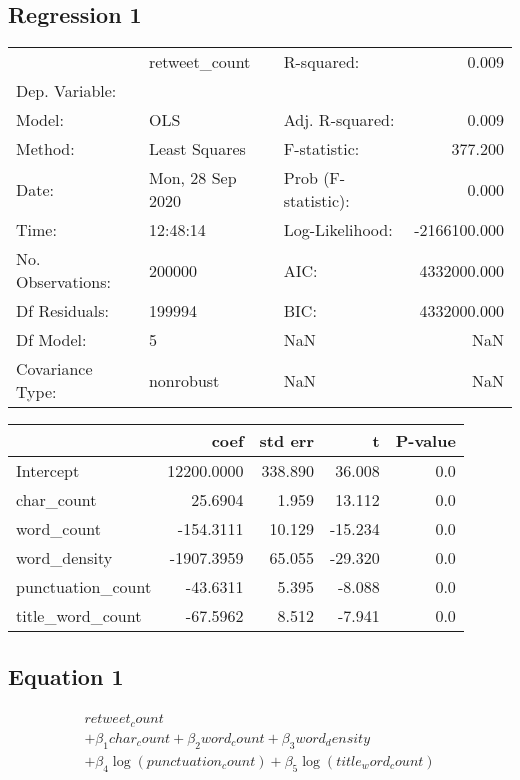 
\subsection{Regression 1}
\begin{tabular}{lllr}
\toprule
{} &     retweet\_count &           R-squared: &        0.009 \\
Dep. Variable:    &                   &                      &              \\
\midrule
Model:            &               OLS &      Adj. R-squared: &        0.009 \\
Method:           &     Least Squares &         F-statistic: &      377.200 \\
Date:             &  Mon, 28 Sep 2020 &  Prob (F-statistic): &        0.000 \\
Time:             &          12:48:14 &      Log-Likelihood: & -2166100.000 \\
No. Observations: &            200000 &                 AIC: &  4332000.000 \\
Df Residuals:     &            199994 &                 BIC: &  4332000.000 \\
Df Model:         &                 5 &                  NaN &          NaN \\
Covariance Type:  &         nonrobust &                  NaN &          NaN \\
\bottomrule
\end{tabular}

\begin{tabular}{lrrrr}
\toprule
{} &        coef &  std err &       t &  P-value \\
\midrule
Intercept         &  12200.0000 &  338.890 &  36.008 &      0.0 \\
char\_count        &     25.6904 &    1.959 &  13.112 &      0.0 \\
word\_count        &   -154.3111 &   10.129 & -15.234 &      0.0 \\
word\_density      &  -1907.3959 &   65.055 & -29.320 &      0.0 \\
punctuation\_count &    -43.6311 &    5.395 &  -8.088 &      0.0 \\
title\_word\_count  &    -67.5962 &    8.512 &  -7.941 &      0.0 \\
\bottomrule
\end{tabular}



\subsection{Equation 1}
\begin{multline*} \begin{gathered}retweet_count \\  + \beta_{1}char_count + \beta_{2}word_count + \beta_{3}word_density \\  + \beta_{4}\log(punctuation_count) + \beta_{5}\log(title_word_count)\end{gathered} \end{multline*}

